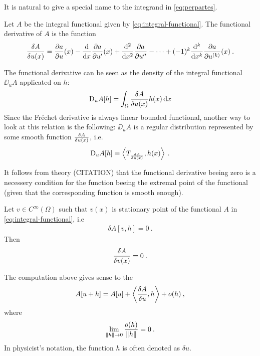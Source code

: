 It is natural to give a special name to the integrand in \eqref{eq:perpartes}.

\begin{definition}
    Let $A$ be the integral functional given by \eqref{eq:integral-functional}. The functional derivative of $A$ is the function
    \begin{align}
        \frac{\delta A}{\delta u(x)} = \frac{\partial a}{\partial u}(x) - \frac{\mathrm{d}}{\mathrm{d}x} \frac{\partial a}{\partial u'}(x) + \frac{\mathrm{d}^2}{\mathrm{d}x^2} \frac{\partial a}{\partial u''} - \cdots + (-1)^k \frac{\mathrm{d}^k}{\mathrm{d}x^k} \frac{\partial a}{\partial u^{(k)}}(x) \:.
    \end{align}
\end{definition}

The functional derivative can be seen as the density of the integral functional $\DD_u A$ applicated on $h$: 
\begin{align}
    \mathrm{D}_u A[h] = \int_\Omega \frac{\delta A}{\delta u(x)} h(x) \, \mathrm{d} x
\end{align}
Since the Fréchet derivative is always linear bounded functional, another way to look at this relation is the following: $\DD_u A$ is a regular distribution represented by some smooth function $\frac{\delta A}{\delta u(x)}$, i.e.
\begin{align}
    \mathrm{D}_u A[h] = \left \langle T_{\frac{\delta A}{\delta u(x)}} ,h(x) \right \rangle \:.
\end{align}

It follows from theory (CITATION) that the functional derivative beeing zero is a necessery condition for the function beeing the extremal point of the functional (given that the corresponding function is smooth enough).

\begin{theorem}
    Let $v \in C^\infty(\Omega)$ such that $v(x)$ is stationary point of the functional $A$ in \eqref{eq:integral-functional}, i.e
    \begin{align}
        \delta A[v,h] = 0 \:.
    \end{align}
    Then  
    \begin{align}
        \frac{\delta A}{\delta v(x)} = 0 \:.
    \end{align}
\end{theorem}

The computation above gives sense to the 
\begin{align}
    A[u+h] = A[u] + \left \langle \frac{\delta A}{\delta u} ,h \right \rangle + o(h)\:,
\end{align}
where
\begin{align}
    \lim_{\left \Vert h \right \Vert \rightarrow 0} \frac{o(h)}{\left \Vert h \right \Vert} = 0 \:.
\end{align}
In physicist's notation, the function $h$ is often denoted as $\delta u$.


